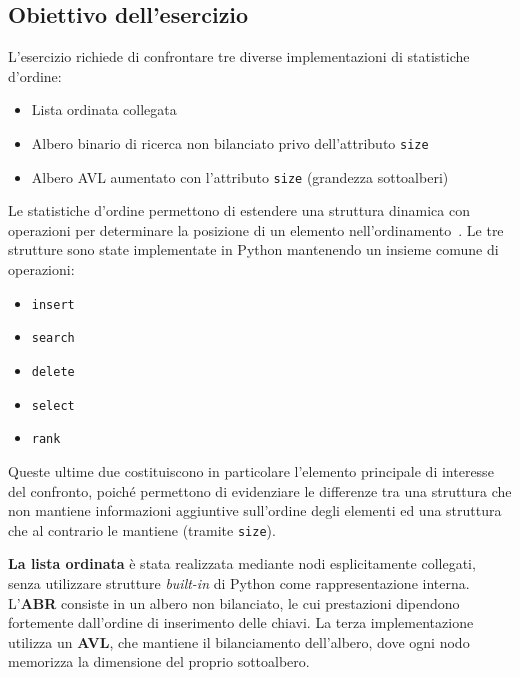 \documentclass[a4paper,11pt]{article}
\begin{document}
\subsection{Obiettivo dell'esercizio}
L'esercizio richiede di confrontare tre diverse implementazioni di statistiche d'ordine:
\begin{itemize}
    \item Lista ordinata collegata
    
    \item Albero binario di ricerca non bilanciato privo dell'attributo \texttt{size}
    
    \item Albero AVL aumentato con l'attributo \texttt{size} (grandezza sottoalberi)
    
\end{itemize}

Le statistiche d'ordine permettono di estendere una struttura dinamica con operazioni per determinare la posizione di un elemento nell'ordinamento~\cite{cormen2009,slide-asd-2025}.
Le tre strutture sono state implementate in Python mantenendo un insieme comune di operazioni: 
\begin{itemize}
    \item \texttt{insert}
    
    \item \texttt{search}
    
    \item \texttt{delete}
    
    \item \texttt{select}
    
    \item \texttt{rank}
\end{itemize}
Queste ultime due costituiscono in particolare l'elemento principale di interesse del confronto, poiché permettono di evidenziare le differenze tra una struttura che non mantiene informazioni aggiuntive sull'ordine degli elementi ed una struttura che al contrario le mantiene (tramite \texttt{size}).

\textbf{La lista ordinata} è stata realizzata mediante nodi esplicitamente collegati, senza utilizzare strutture \textit{built-in} di Python come rappresentazione interna. L'\textbf{ABR} consiste in un albero non bilanciato, le cui prestazioni dipendono fortemente dall'ordine di inserimento delle chiavi. La terza implementazione utilizza un \textbf{AVL}, che mantiene il bilanciamento dell'albero, dove ogni nodo memorizza la dimensione del proprio sottoalbero.
\end{document}
